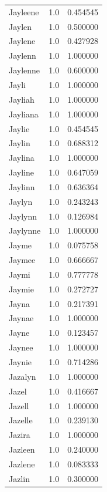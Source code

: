 \documentclass[
  letterpaper,
  DIV=11,
  numbers=noendperiod]{scrreprt}
\begin{document}
\begin{tabular}{lrr}
Jayleene        &   1.0 &   0.454545 \\
Jaylen          &   1.0 &   0.500000 \\
Jaylene         &   1.0 &   0.427928 \\
Jaylenn         &   1.0 &   1.000000 \\
Jaylenne        &   1.0 &   0.600000 \\
Jayli           &   1.0 &   1.000000 \\
Jayliah         &   1.0 &   1.000000 \\
Jayliana        &   1.0 &   1.000000 \\
Jaylie          &   1.0 &   0.454545 \\
Jaylin          &   1.0 &   0.688312 \\
Jaylina         &   1.0 &   1.000000 \\
Jayline         &   1.0 &   0.647059 \\
Jaylinn         &   1.0 &   0.636364 \\
Jaylyn          &   1.0 &   0.243243 \\
Jaylynn         &   1.0 &   0.126984 \\
Jaylynne        &   1.0 &   1.000000 \\
Jayme           &   1.0 &   0.075758 \\
Jaymee          &   1.0 &   0.666667 \\
Jaymi           &   1.0 &   0.777778 \\
Jaymie          &   1.0 &   0.272727 \\
Jayna           &   1.0 &   0.217391 \\
Jaynae          &   1.0 &   1.000000 \\
Jayne           &   1.0 &   0.123457 \\
Jaynee          &   1.0 &   1.000000 \\
Jaynie          &   1.0 &   0.714286 \\
Jazalyn         &   1.0 &   1.000000 \\
Jazel           &   1.0 &   0.416667 \\
Jazell          &   1.0 &   1.000000 \\
Jazelle         &   1.0 &   0.239130 \\
Jazira          &   1.0 &   1.000000 \\
Jazleen         &   1.0 &   0.240000 \\
Jazlene         &   1.0 &   0.083333 \\
Jazlin          &   1.0 &   0.300000 \\

\end{tabular}
\end{document}
